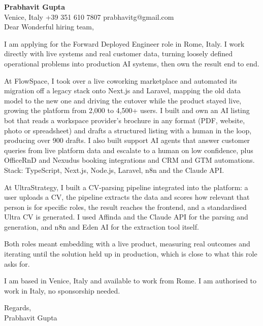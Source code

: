 \documentclass[a4paper,10.5pt]{article}
\begin{document}
\textbf{Prabhavit Gupta}\\
Venice, Italy \textbar{} +39 351 610 7807 \textbar{} prabhavitg@gmail.com\\[10pt]
Dear Wonderful hiring team,

I am applying for the Forward Deployed Engineer role in Rome, Italy. I work directly with live systems and real customer data, turning loosely defined operational problems into production AI systems, then own the result end to end.

At FlowSpace, I took over a live coworking marketplace and automated its migration off a legacy stack onto Next.js and Laravel, mapping the old data model to the new one and driving the cutover while the product stayed live, growing the platform from 2,000 to 4,500+ users. I built and own an AI listing bot that reads a workspace provider's brochure in any format (PDF, website, photo or spreadsheet) and drafts a structured listing with a human in the loop, producing over 900 drafts. I also built support AI agents that answer customer queries from live platform data and escalate to a human on low confidence, plus OfficeRnD and Nexudus booking integrations and CRM and GTM automations. Stack: TypeScript, Next.js, Node.js, Laravel, n8n and the Claude API.

At UltraStrategy, I built a CV-parsing pipeline integrated into the platform: a user uploads a CV, the pipeline extracts the data and scores how relevant that person is for specific roles, the result reaches the frontend, and a standardised Ultra CV is generated. I used Affinda and the Claude API for the parsing and generation, and n8n and Eden AI for the extraction tool itself.

Both roles meant embedding with a live product, measuring real outcomes and iterating until the solution held up in production, which is close to what this role asks for.

I am based in Venice, Italy and available to work from Rome. I am authorised to work in Italy, no sponsorship needed.

Regards,\\
Prabhavit Gupta
\end{document}
